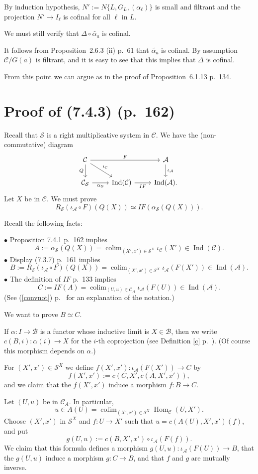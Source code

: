 \documentclass[12pt]{article}
\theoremstyle{remark}%
\newcommand{\bu}{\bullet}
\newcommand{\n}{\noindent}
\newcommand{\A}{\mathcal A}
\newcommand{\B}{\mathcal B}
\newcommand{\C}{\mathcal C}
\newcommand{\SSS}{\mathcal S}
\newcommand{\pr}{Proposition}
\newcommand{\cn}{(See (\ref{convnot}) p.~\pageref{convnot} for an explanation of the notation.) }
\DeclareMathOperator*{\coli}{colim}
\DeclareMathOperator*{\co}{colim}
\DeclareMathOperator{\h}{Hom}
\DeclareMathOperator{\Ind}{Ind}
\begin{document}
By induction hypothesis, $N':=N\{L,G_L,(\alpha_\ell)\}$ is small and filtrant and the projection $N'\to I_\ell$ is cofinal for all $\ell$ in $L$. 

We must still verify that $\Delta\circ\widetilde{\alpha_a}$ is cofinal. 

It follows from \pr\ 2.6.3 (ii) p.~61 that $\widetilde{\alpha_a}$ is cofinal. By assumption $\C/G(a)$ is filtrant, and it is easy to see that this implies that $\Delta$ is cofinal. 

From this point we can argue as in the proof of \pr\ 6.1.13 p.~134. 
%
\section{Proof of (7.4.3) (p.~162)} %
%
Recall that $\SSS$ is a right multiplicative system in $\C$. We have the (non-commutative) diagram
$$
\begin{tikzcd}
\C\ar{rr}{F}\ar{d}[swap]{Q}\ar{dr}{\iota_\C}&&\A\ar{d}{\iota_\A}\\ 
\C_\SSS\ar{r}[swap]{\alpha_\SSS}&\Ind(\C)\ar{r}[swap]{IF}&\Ind(\A).
\end{tikzcd}
$$
Let $X$ be in $\C$. We must prove 
$$
R_\SSS(\iota_\A\circ F)(Q(X))\simeq IF(\alpha_\SSS(Q(X))).
$$

Recall the following facts: 

\n$\bu$ Proposition 7.4.1 p.~162 implies
$$
A:=\alpha_\SSS(Q(X))=\coli_{(X',x')\in\SSS^X}\iota_\C(X')\in\Ind(\C).
$$ 
$\bu$ Display (7.3.7) p.~161 implies
$$
B:=R_\SSS(\iota_\A\circ F)(Q(X))=\coli_{(X',x')\in\SSS^X}\iota_\A(F(X'))\in\Ind(\A).
$$
$\bu$ The definition of $IF$ p.~133 implies
$$
C:=IF(A)=\coli_{(U,u)\in\C_A}\iota_\A(F(U))\in\Ind(\A).
$$ 
\cn 

We want to prove $B\simeq C$.  

\n{\em Notation.} If $\alpha:I\to\B$ is a functor whose inductive limit is $X\in\B$, then we write $c(B,i):\alpha(i)\to X$ for the $i$-th coprojection (see Definition \ref{c} p.~\pageref{c}). (Of course this morphism depends on $\alpha$.) 

For $(X',x')\in\SSS^X$ we define $f(X',x'):\iota_\A(F(X'))\to C$ by 
$$
f(X',x'):=c(C,X',c(A,X',x')),
$$ 
and we claim that the $f(X',x')$ induce a morphism $f:B\to C$. 

Let $(U,u)$ be in $\C_A$. In particular, 
$$
u\in A(U)=\co_{(X',x')\in\SSS^X}\h_\C(U,X').
$$ 
Choose $(X',x')$ in $\SSS^X$ and $f:U\to X'$ such that $u=c(A(U),X',x')(f)$, and put  
$$
g(U,u):=c(B,X',x')\circ\iota_\A(F(f)).
$$ 
We claim that this formula defines a morphism $g(U,u):\iota_\A(F(U))\to B$, that the $g(U,u)$ induce a morphism $g:C\to B$, and that $f$ and $g$ are mutually inverse. 
\end{document}
